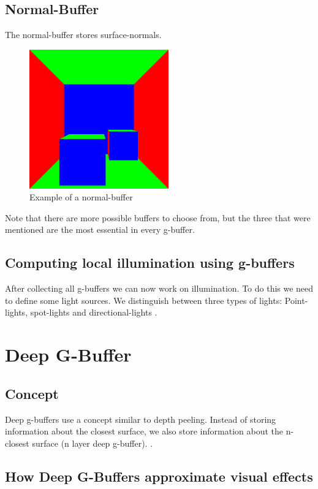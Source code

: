 \documentclass{ACGSeminar}
\begin{document}
	\subsection{Normal-Buffer}
		The normal-buffer stores surface-normals.
		\begin{figure}[htb!]%
			\begin{center}%
				\includegraphics[width=6cm]{img/normal_buffer.png}
			\end{center}%
			\caption{Example of a normal-buffer}%
			\label{fig:normal_buffer}%
		\end{figure}%
		Note that there are more possible buffers to choose from, but the three that were mentioned are the most essential in every g-buffer.
	\subsection{Computing local illumination using g-buffers}
		After collecting all g-buffers we can now work on illumination. To do this we need to define some light sources. We distinguish between three types of lights:
		Point-lights, spot-lights and directional-lights \cite{DST}.

\section{Deep G-Buffer}
	\subsection{Concept}
		Deep g-buffers use a concept similar to depth peeling. Instead of storing information about the closest surface, we also store information about the n-closest surface (n layer deep g-buffer). \cite{NDGB}.
	\subsection{How Deep G-Buffers approximate visual effects}
\end{document}
